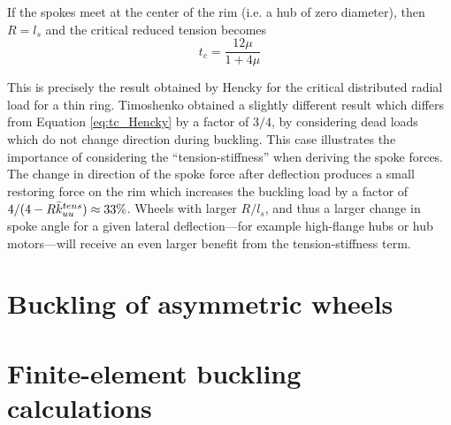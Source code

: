 \documentclass[\rootdir/thesis.tex]{subfiles}
\begin{document}
If the spokes meet at the center of the rim (i.e. a hub of zero diameter), then $R=l_s$ and the critical reduced tension becomes
\begin{equation}
\label{eq:tc_Hencky}
t_c = \frac{12\mu}{1 + 4\mu}
\end{equation}

This is precisely the result obtained by Hencky for the critical distributed radial load for a thin ring\cite{Henky}. Timoshenko obtained a slightly different result which differs from Equation \eqref{eq:tc_Hencky} by a factor of  $3/4$, by considering dead loads which do not change direction during buckling. This case illustrates the importance of considering the ``tension-stiffness'' when deriving the spoke forces. The change in direction of the spoke force after deflection produces a small restoring force on the rim which increases the buckling load by a factor of $4/(4 - R\bar{k}_{uu}^{tens}) \approx 33\%$. Wheels with larger $R/l_s$, and thus a larger change in spoke angle for a given lateral deflection---for example high-flange hubs or hub motors---will receive an even larger benefit from the tension-stiffness term.

\section{Buckling of asymmetric wheels}

\section{Finite-element buckling calculations}
\end{document}

